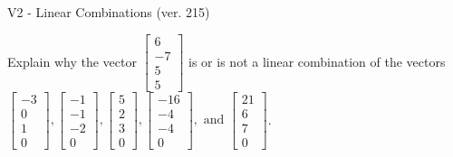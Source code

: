 \begin{exercise}
  \begin{exerciseTitle}V2 - Linear Combinations (ver. 215)\end{exerciseTitle}
  \begin{exerciseStatement}
    Explain why the vector \(\left[\begin{array}{c}
6 \\
-7 \\
5 \\
5
\end{array}\right]\)  is or is not a linear 
	combination of the vectors \(\left[\begin{array}{c}
-3 \\
0 \\
1 \\
0
\end{array}\right] , \left[\begin{array}{c}
-1 \\
-1 \\
-2 \\
0
\end{array}\right] , \left[\begin{array}{c}
5 \\
2 \\
3 \\
0
\end{array}\right] , \left[\begin{array}{c}
-16 \\
-4 \\
-4 \\
0
\end{array}\right] , \text{ and } \left[\begin{array}{c}
21 \\
6 \\
7 \\
0
\end{array}\right]\).
	



\end{exerciseStatement}
\end{exercise}
